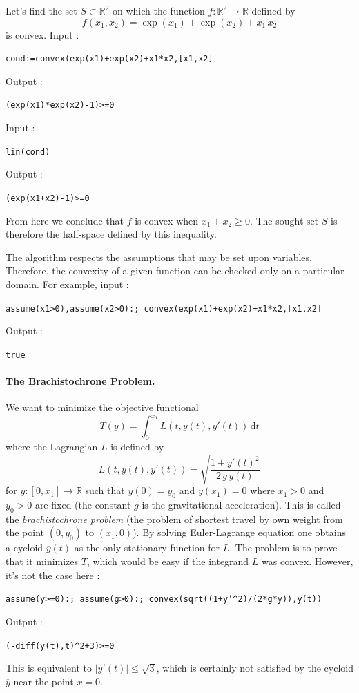 \documentclass[a4paper,11pt]{book}
\begin{document}
Let's find the set $S\subset\mathbb{R}^2$ on which the function $f:\mathbb{R}^2\to\mathbb{R}$ defined by
\[ f(x_1,x_2)=\exp(x_1)+\exp(x_2)+x_1\,x_2 \]
is convex. Input :
\begin{center}
  \tt cond:=convex(exp(x1)+exp(x2)+x1*x2,[x1,x2]
\end{center}
Output :
\begin{center}
  \tt (exp(x1)*exp(x2)-1)>=0
\end{center}
Input :
\begin{center}
  \tt lin(cond)
\end{center}
Output :
\begin{center}
  \tt (exp(x1+x2)-1)>=0
\end{center}
From here we conclude that $f$ is convex when $x_1+x_2\geq 0$. The sought set $S$ is therefore the half-space defined by this inequality.

The algorithm respects the assumptions that may be set upon variables. Therefore, the convexity of a given function can be checked only on a particular domain. For example, input :
\begin{center}
  \tt assume(x1>0),assume(x2>0):; convex(exp(x1)+exp(x2)+x1*x2,[x1,x2]
\end{center}
Output :
\begin{center}
  \tt true
\end{center}

\paragraph{\label{brachistochrone}The Brachistochrone Problem.}
We want to minimize the objective functional \[T(y)=\int_0^{x_1}L(t,y(t),y'(t))\,\mathrm{d} t\] where the Lagrangian $L$ is defined by
\[ L(t,y(t),y'(t))=\sqrt{\frac{1+y'(t)^2}{2\,g\,y(t)}} \]
for $y:[0,x_1]\to\mathbb{R}$ such that $y(0)=y_0$ and $y(x_1)=0$ where $x_1>0$ and $y_0>0$ are fixed (the constant $g$ is the gravitational acceleration). This is called the \emph{brachistochrone problem} (the problem of shortest travel by own weight from the point $(0,y_0)$ to $(x_1,0)$).
By solving Euler-Lagrange equation one obtains a cycloid $\overline{y}(t)$ as the only stationary function for $L$. The problem is to prove that it minimizes $T$, which would be easy if the integrand $L$ was convex. However, it's not the case here :
\begin{center}
  \tt assume(y>=0):; assume(g>0):; convex(sqrt((1+y'\verb|^|2)/(2*g*y)),y(t))
\end{center}
Output :
\begin{center}
  \tt (-diff(y(t),t)\verb|^|2+3)>=0
\end{center}
This is equivalent to $|y'(t)|\leq\sqrt{3}$, which is certainly not satisfied by the cycloid $\overline{y}$ near the point $x=0$.
\end{document}
